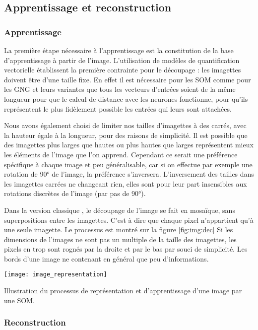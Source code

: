 	\subsection{Apprentissage et reconstruction}\label{sec:img:compression}
	\subsubsection{Apprentissage}
	La première étape nécessaire à l'apprentissage est la constitution de la base d'apprentissage à partir de l'image. L'utilisation de modèles de quantification vectorielle établissent la première contrainte pour le découpage : les imagettes doivent être d'une taille fixe. En effet il est nécessaire pour les SOM comme pour les GNG et leurs variantes que tous les vecteurs d'entrées soient de la même longueur pour que le calcul de distance avec les neurones fonctionne, pour qu'ils représentent le plus fidèlement possible les entrées qui leurs sont attachées.

	Nous avons également choisi de limiter nos tailles d'imagettes à des carrés, avec la hauteur égale à la longueur, pour des raisons de simplicité. Il est possible que des imagettes plus larges que hautes ou plus hautes que larges représentent mieux les éléments de l'image que l'on apprend. Cependant ce serait une préférence spécifique à chaque image et peu généralisable, car si on effectue par exemple une rotation de 90° de l'image, la préférence s'inversera. L'inversement des tailles dans les imagettes carrées ne changeant rien, elles sont pour leur part insensibles aux rotations discrètes de l'image (par pas de 90°).

	Dans la version classique \cite{amerijckx-compression}, le découpage de l'image se fait en mosaïque, sans superpositions entre les imagettes. C'est à dire que chaque pixel n'appartient qu'à une seule imagette. Le processus est montré sur la figure \ref{fig:img:dec} Si les dimensions de l'images ne sont pas un multiple de la taille des imagettes, les pixels en trop sont rognés par la droite et par le bas par souci de simplicité. Les bords d'une image ne contenant en général que peu d'informations.

	\begin{figureth}
		\texttt{[image: image\_representation]}
		\caption[Représentation d'une image]{Illustration du processus de représentation et d'apprentissage d'une image par une SOM.}\label{fig:img:dec}
	\end{figureth}

	\subsubsection{Reconstruction}

